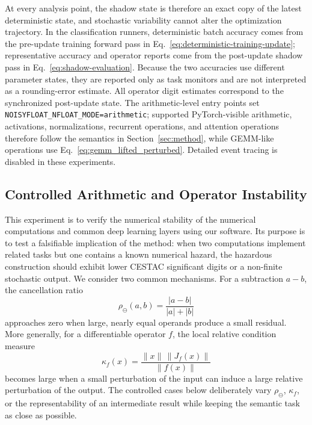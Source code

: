 \documentclass[manuscript, screen]{acmart}
\begin{document}
At every analysis point, the shadow state is therefore an exact copy of the latest deterministic state, and stochastic variability cannot alter the optimization trajectory. In the classification runners, deterministic batch accuracy comes from the pre-update training forward pass in Eq.~\eqref{eq:deterministic-training-update}; representative accuracy and operator reports come from the post-update shadow pass in Eq.~\eqref{eq:shadow-evaluation}. Because the two accuracies use different parameter states, they are reported only as task monitors and are not interpreted as a rounding-error estimate. All operator digit estimates correspond to the synchronized post-update state. The arithmetic-level entry points set \texttt{NOISYFLOAT\_NFLOAT\_MODE=arithmetic}; supported PyTorch-visible arithmetic, activations, normalizations, recurrent operations, and attention operations therefore follow the semantics in Section~\ref{sec:method}, while GEMM-like operations use Eq.~\eqref{eq:gemm_lifted_perturbed}. Detailed event tracing is disabled in these experiments.


\subsection{Controlled Arithmetic and Operator Instability}
\label{sec:exp-controlled-instability}

This experiment is  to verify the numerical stability of the numerical computations and common deep learning layers using our software. Its purpose is to test a falsifiable implication of the method: when two computations implement related tasks but one contains a known numerical hazard, the hazardous construction should exhibit lower CESTAC significant digits or a non-finite stochastic output. We consider two common mechanisms. For a subtraction $a-b$, the cancellation ratio
\begin{equation}
\rho_{\ominus}(a,b)
=
\frac{|a-b|}{|a|+|b|}
\label{eq:cancellation-ratio}
\end{equation}
approaches zero when large, nearly equal operands produce a small residual. More generally, for a differentiable operator $f$, the local relative condition measure
\begin{equation}
\kappa_f(x)
=
\frac{\|x\|\,\|J_f(x)\|}{\|f(x)\|}
\label{eq:operator-condition-measure}
\end{equation}
becomes large when a small perturbation of the input can induce a large relative perturbation of the output. The controlled cases below deliberately vary $\rho_{\ominus}$, $\kappa_f$, or the representability of an intermediate result while keeping the semantic task as close as possible.
\end{document}
